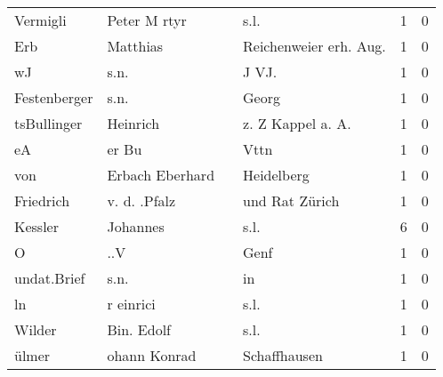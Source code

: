 \begin{center}
\begin{tiny}
\begin{longtabu}{llllrr}
                 Vermigli &                       Peter M rtyr &             &                                        s.l. &          1 &         0 \\
                      Erb &                           Matthias &             &                     Reichenweier erh. Aug.  &          1 &         0 \\
                       wJ &                               s.n. &             &                                      J VJ.  &          1 &         0 \\
             Festenberger &                               s.n. &             &                                       Georg &          1 &         0 \\
              tsBullinger &                           Heinrich &             &                          z. Z Kappel a. A.  &          1 &         0 \\
                       eA &                              er Bu &             &                                        Vttn &          1 &         0 \\
                      von &                    Erbach Eberhard &             &                                  Heidelberg &          1 &         0 \\
                Friedrich &                       v. d. .Pfalz &             &                              und Rat Zürich &          1 &         0 \\
                  Kessler &                           Johannes &             &                                        s.l. &          6 &         0 \\
                        O &                                ..V &             &                                        Genf &          1 &         0 \\
              undat.Brief &                               s.n. &             &                                          in &          1 &         0 \\
                       ln &                          r einrici &             &                                        s.l. &          1 &         0 \\
                   Wilder &                         Bin. Edolf &             &                                        s.l. &          1 &         0 \\
                    ülmer &                       ohann Konrad &             &                                Schaffhausen &          1 &         0 \\

\end{longtabu}
\end{tiny}
\end{center}
